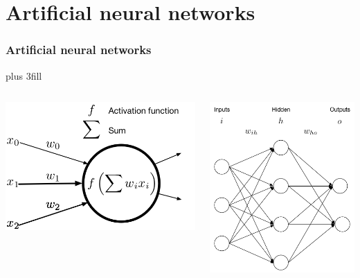 \section{Artificial neural networks}
\begin{frame}[fragile]\frametitle{Artificial neural networks}
\vskip0pt plus 3fill
\begin{columns}
\begin{column}{0.5\textwidth}
\includegraphics[width=\linewidth]{neuron.png}
\end{column}
\vrule
\begin{column}{0.5\textwidth}
\includegraphics[width=\linewidth]{ann.png}

\end{column}
\end{columns}
\end{frame}
